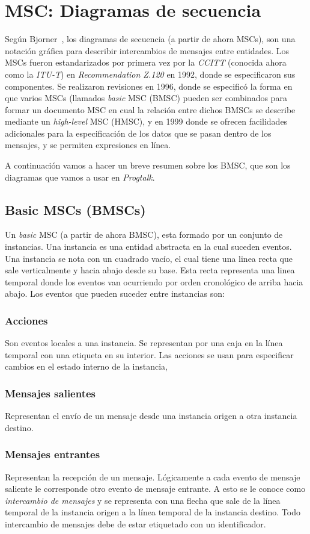\chapter{MSC: Diagramas de secuencia}
\label{ch:msc}

Según Bjorner~\cite{bjorner}, los diagramas de secuencia (a partir de
ahora MSCs), son una notación gráfica para describir intercambios de
mensajes entre entidades. Los MSCs fueron estandarizados por primera
vez por la \textit{CCITT} (conocida ahora como la \textit{ITU-T}) en
\textit{Recommendation Z.120} en 1992, donde se especificaron sus
componentes. Se realizaron revisiones en 1996, donde se especificó la
forma en que varios MSCs (llamados \textit{basic} MSC (BMSC) pueden
ser combinados para formar un documento MSC en cual la relación entre
dichos BMSCs se describe mediante un \textit{high-level} MSC (HMSC), y
en 1999 donde se ofrecen facilidades adicionales para la
especificación de los datos que se pasan dentro de los mensajes, y se
permiten expresiones en línea.

A continuación vamos a hacer un breve resumen sobre los BMSC, que son
los diagramas que vamos a usar en \textit{Progtalk}.

\section{Basic MSCs (BMSCs)}
Un \textit{basic} MSC (a partir de ahora BMSC), esta formado por un
conjunto de instancias. Una instancia es una entidad abstracta en la
cual suceden eventos. Una instancia se nota con un cuadrado vacío, el
cual tiene una linea recta que sale verticalmente y hacia abajo desde
su base. Esta recta representa una linea temporal donde los eventos
van ocurriendo por orden cronológico de arriba hacia abajo. Los
eventos que pueden suceder entre instancias son:

\subsection*{Acciones}
Son eventos locales a una instancia. Se representan por una caja en la
línea temporal con una etiqueta en su interior. Las acciones se usan
para especificar cambios en el estado interno de la instancia,
\subsection*{Mensajes salientes} 
Representan el envío de un mensaje desde una instancia origen a otra
instancia destino.
\subsection*{Mensajes entrantes}
Representan la recepción de un mensaje. Lógicamente a cada evento de
mensaje saliente le corresponde otro evento de mensaje entrante. A
esto se le conoce como \textit{intercambio de mensajes} y se representa con una
flecha que sale de la línea temporal de la instancia origen a la
línea temporal de la instancia destino. Todo intercambio de mensajes
debe de estar etiquetado con un identificador.
